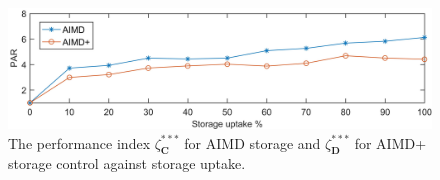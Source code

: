 \begin{figure}[htb]\centering
 \includegraphics{_chapter1/fig/input/sorage-par}
 \caption{The performance index $\zeta_\textbf{C}^{***}$ for AIMD storage and $\zeta_\textbf{D}^{***}$ for AIMD+ storage control against storage uptake.}
 \label{ch1:fig:storage-par}
\end{figure}
